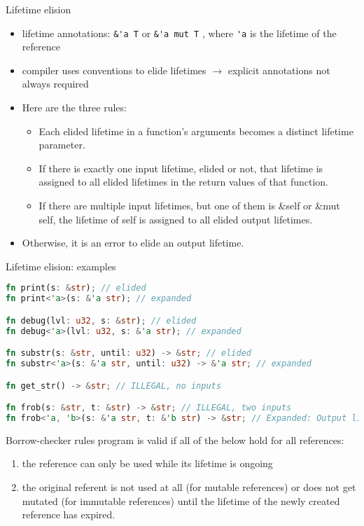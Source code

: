 \documentclass{beamer}
\begin{document}
\begin{frame}[fragile]{Lifetime elision}
\begin{itemize}
  \item lifetime annotations: \verb|&'a T| or \verb|&'a mut T| , where \verb|'a| is the lifetime of the reference
  \item compiler uses conventions to elide lifetimes $\rightarrow$ explicit annotations not always required
  \item Here are the three rules:
  \begin{itemize}
    \item Each elided lifetime in a function’s arguments becomes a distinct lifetime parameter.
    \item If there is exactly one input lifetime, elided or not, that lifetime is assigned to all elided lifetimes in the return values of that function.
    \item If there are multiple input lifetimes, but one of them is &self or &mut self, the lifetime of self is assigned to all elided output lifetimes.
  \end{itemize}
  \item Otherwise, it is an error to elide an output lifetime.
\end{itemize}
\end{frame}


\begin{frame}[fragile]{Lifetime elision: examples}
\begin{lstlisting}[language=Rust]
fn print(s: &str); // elided
fn print<'a>(s: &'a str); // expanded

fn debug(lvl: u32, s: &str); // elided
fn debug<'a>(lvl: u32, s: &'a str); // expanded

fn substr(s: &str, until: u32) -> &str; // elided
fn substr<'a>(s: &'a str, until: u32) -> &'a str; // expanded

fn get_str() -> &str; // ILLEGAL, no inputs

fn frob(s: &str, t: &str) -> &str; // ILLEGAL, two inputs
fn frob<'a, 'b>(s: &'a str, t: &'b str) -> &str; // Expanded: Output lifetime is ambiguous
\end{lstlisting}
\end{frame}


\begin{frame}[fragile]{Borrow-checker rules}
  program is valid if all of the below hold for all references:
  \begin{enumerate}
    \item the reference can only be used while its lifetime is ongoing
    \item the original referent is not used at all (for mutable references) or does not get mutated (for immutable references) until the lifetime of the newly created reference has expired.
  \end{enumerate}
\end{frame}
\end{document}
